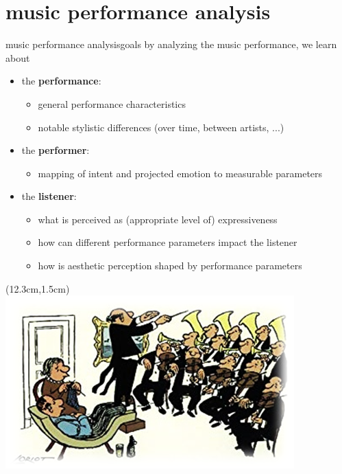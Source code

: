     \section[performance analysis]{music performance analysis}
        \begin{frame}{music performance analysis}{goals}
            by analyzing the music performance, we learn about
            \bigskip

            \begin{itemize}
                \item	the \textbf{performance}: 
                    \begin{itemize}
                        \item   general performance characteristics
                        \item   notable stylistic differences (over time, between artists, ...)
                    \end{itemize}
                \smallskip
                \item	the \textbf{performer}: 
                    \begin{itemize}
                        \item   mapping of intent and projected emotion to measurable parameters
                    \end{itemize}
                \smallskip
                \item	the \textbf{listener}: 
                    \begin{itemize}
                        \item   what is perceived as (appropriate level of) expressiveness
                        \item   how can different performance parameters impact the listener
                        \item   how is aesthetic perception shaped by performance parameters
                    \end{itemize}
            \end{itemize}

            \begin{textblock*}{100mm}(12.3cm,1.5cm)
                \includegraphics[scale=.5,keepaspectratio]{graph/life_concert}
            \end{textblock*}
 
        \end{frame}
            
